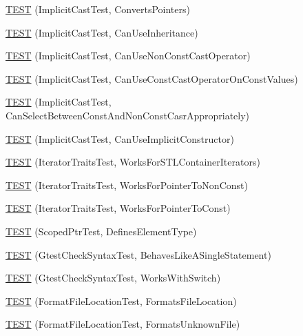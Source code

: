 \begin{DoxyCompactItemize}
\item 
\hyperlink{namespacetesting_1_1internal_a5d2ec1128c80363b06070f403f682490}{T\+E\+ST} (Implicit\+Cast\+Test, Converts\+Pointers)
\item 
\hyperlink{namespacetesting_1_1internal_a1b304dcd3ac71095f2e7d9e9b43c4755}{T\+E\+ST} (Implicit\+Cast\+Test, Can\+Use\+Inheritance)
\item 
\hyperlink{namespacetesting_1_1internal_a8554484c7c0ea536bc393c254490aaff}{T\+E\+ST} (Implicit\+Cast\+Test, Can\+Use\+Non\+Const\+Cast\+Operator)
\item 
\hyperlink{namespacetesting_1_1internal_af7f631f9fbde27b19a65d50fc29e1420}{T\+E\+ST} (Implicit\+Cast\+Test, Can\+Use\+Const\+Cast\+Operator\+On\+Const\+Values)
\item 
\hyperlink{namespacetesting_1_1internal_a62a3b62658f9d47733cb7b5c8f69b2ad}{T\+E\+ST} (Implicit\+Cast\+Test, Can\+Select\+Between\+Const\+And\+Non\+Const\+Casr\+Appropriately)
\item 
\hyperlink{namespacetesting_1_1internal_ad5c2cf37cc5aa78744012255cae78f9b}{T\+E\+ST} (Implicit\+Cast\+Test, Can\+Use\+Implicit\+Constructor)
\item 
\hyperlink{namespacetesting_1_1internal_abd56ca990c5b8c1aea44d15028a74f33}{T\+E\+ST} (Iterator\+Traits\+Test, Works\+For\+S\+T\+L\+Container\+Iterators)
\item 
\hyperlink{namespacetesting_1_1internal_a642234d85836450bb8795cf0a8a9f908}{T\+E\+ST} (Iterator\+Traits\+Test, Works\+For\+Pointer\+To\+Non\+Const)
\item 
\hyperlink{namespacetesting_1_1internal_afc0e95a0472d243967fd4720c681c478}{T\+E\+ST} (Iterator\+Traits\+Test, Works\+For\+Pointer\+To\+Const)
\item 
\hyperlink{namespacetesting_1_1internal_a99f56e2e9d5b30a879f877cc72bb0c0c}{T\+E\+ST} (Scoped\+Ptr\+Test, Defines\+Element\+Type)
\item 
\hyperlink{namespacetesting_1_1internal_a26d00130a017a66d0d60dc5a02a13d25}{T\+E\+ST} (Gtest\+Check\+Syntax\+Test, Behaves\+Like\+A\+Single\+Statement)
\item 
\hyperlink{namespacetesting_1_1internal_a4dfd147ff396984fca799878cb53dcea}{T\+E\+ST} (Gtest\+Check\+Syntax\+Test, Works\+With\+Switch)
\item 
\hyperlink{namespacetesting_1_1internal_a1a1c20d78e9e75b9c7f2b767eb62611b}{T\+E\+ST} (Format\+File\+Location\+Test, Formats\+File\+Location)
\item 
\hyperlink{namespacetesting_1_1internal_ace2f5407afdfb0767035d44b6758e4a0}{T\+E\+ST} (Format\+File\+Location\+Test, Formats\+Unknown\+File)

\end{DoxyCompactItemize}
